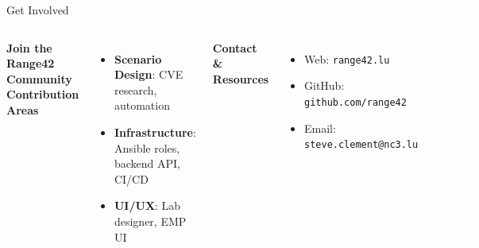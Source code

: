 \documentclass[aspectratio=169]{beamer}
\begin{document}
\begin{frame}[shrink=10]{Get Involved \; \faRocket}
  \begin{columns}[T]
    \textbf{Join the Range42 Community}\\[1mm]
    
    \textbf{Contribution Areas}
    \begin{itemize}
      \item \textbf{Scenario Design}: CVE research, automation
      \item \textbf{Infrastructure}: Ansible roles, backend API, CI/CD
      \item \textbf{UI/UX}: Lab designer, EMP UI
    \end{itemize}
    \vspace{1mm}
    \textbf{Contact \& Resources}
    \begin{itemize}
      \item Web: \texttt{range42.lu}
      \item GitHub: \texttt{github.com/range42}
      \item Email: \texttt{steve.clement@nc3.lu}
    \end{itemize}

   \vspace{2\baselineskip}
    \noindent \textcolor{white}{Typeset with \LaTeX{}} {\textcolor{blue}{\faHeart}}


\end{columns}
\end{frame}
\end{document}
